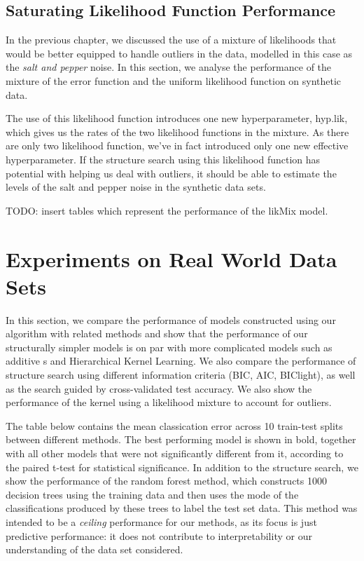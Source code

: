 \documentclass[a4paper,12pt ]{report}
\begin{document}
 
 \subsection{Saturating Likelihood Function Performance}
 
 In the previous chapter, we discussed the use of a mixture of likelihoods that would be better equipped to handle outliers in the data, modelled in this case as the \emph{salt and pepper} noise. In this section, we analyse the performance of the mixture of the 
 error function and the uniform likelihood function on synthetic data. 
 
 The use of this likelihood function introduces one new hyperparameter, hyp.lik, which gives us the rates of the two likelihood functions in the mixture. As there are only two likelihood function, we've in fact introduced only one new effective hyperparameter. If the structure
 search using this likelihood function has potential with helping us deal with outliers, it should be able to estimate the levels of the salt and pepper noise in the synthetic data sets.
 
 TODO: insert tables which represent the performance of the likMix model.
 

 \clearpage



\section{Experiments on Real World Data Sets}

In this section, we compare the performance of models constructed using our algorithm with related methods and show that the performance of our structurally simpler models is on par with more complicated models such as additive \gp{}s \cite{duvenaud2011additive11} and Hierarchical Kernel Learning. 
We also compare the performance of structure search using different information criteria (BIC, AIC, BIClight), as well as the search guided by cross-validated test accuracy. We also show the performance of the kernel using a likelihood mixture to account for outliers. 

The table below contains the mean classication error across 10 train-test splits between different methods. The best performing model is shown in bold, together with all other models that were not significantly different from it, according to the paired t-test for statistical significance. In
addition to the structure search, we show the performance of the random forest method, which constructs 1000 decision trees using the training data and then uses the mode of the classifications produced by these trees to label the test set data. This method was intended to be a \emph{ceiling}
performance for our methods, as its focus is just predictive performance: it does not contribute to interpretability or our understanding of the data set considered. 
\end{document}
